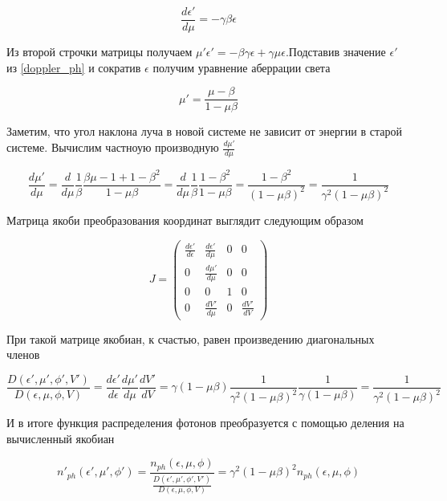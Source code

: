 \begin{equation}
	\frac{d\epsilon'}{d\mu}=-\gamma\beta\epsilon
\end{equation}

Из второй строчки матрицы получаем $\mu'\epsilon'=-\beta\gamma\epsilon+\gamma\mu\epsilon$.Подставив значение $\epsilon'$ из \ref{doppler_ph} и сократив $\epsilon$ получим уравнение аберрации света

\begin{equation}\label{aberration_ph}
	\mu'=\frac{\mu-\beta}{1-\mu\beta}
\end{equation}

Заметим, что угол наклона луча в новой системе не зависит от энергии в старой системе. Вычислим частноую производную $\frac{d\mu'}{d\mu}$

\begin{equation}
	\frac{d\mu'}{d\mu}=\frac{d}{d\mu}\frac{1}{\beta}\frac{\beta\mu-1+1-\beta^2}{1-\mu\beta}=\frac{d}{d\mu}\frac{1}{\beta}\frac{1-\beta^2}{1-\mu\beta}=\frac{1-\beta^2}{(1-\mu\beta)^2}=\frac{1}{\gamma^2(1-\mu\beta)^2}
\end{equation}

Матрица якоби преобразования координат выглядит следующим образом

\begin{equation}
	J=\left(
	\begin{array}{cccc}
		\frac{d\epsilon'}{d\epsilon} & \frac{d\epsilon'}{d\mu}& 0 & 0\\
		0 & \frac{d\mu'}{d\mu} & 0 & 0\\
		0 & 0 & 1 & 0\\
		0 & \frac{dV'}{d\mu} & 0 & \frac{dV'}{dV}
	\end{array}
	\right)
\end{equation}

При такой матрице якобиан, к счастью, равен произведению диагональных членов

\begin{equation}\label{jacobian_ph}
	\frac{D(\epsilon',\mu',\phi',V')}{D(\epsilon,\mu,\phi,V)}=\frac{d\epsilon'}{d\epsilon}\frac{d\mu'}{d\mu}\frac{dV'}{dV}=\gamma(1-\mu\beta)\frac{1}{\gamma^2(1-\mu\beta)^2}\frac{1}{\gamma(1-\mu\beta)}=\frac{1}{\gamma^2(1-\mu\beta)^2}
\end{equation}

И в итоге функция распределения фотонов преобразуется с помощью деления на вычисленный якобиан

\begin{equation}\label{distribution_ph}
	n'_{ph}(\epsilon',\mu',\phi') = \frac{n_{ph}(\epsilon,\mu,\phi)}{\frac{D(\epsilon',\mu',\phi',V')}{D(\epsilon,\mu,\phi,V)}}=\gamma^2(1-\mu\beta)^2 n_{ph}(\epsilon,\mu,\phi)
\end{equation}


